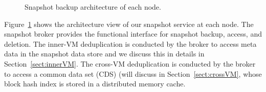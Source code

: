 \begin{figure}[htbp]
  \centering
  \caption{Snapshot backup architecture of each node.}
  \label{fig:arch}
\end{figure}

Figure~\ref{fig:arch} shows the architecture view of our snapshot service
at each node. The snapshot broker provides the functional interface for  snapshot backup, access, and deletion.
The inner-VM  deduplication is conducted by the broker to access meta data in the snapshot data store
and we discuss this in details in Section~\ref{sect:innerVM}.
The cross-VM deduplication is conducted by the broker to access 
a common data set (CDS) (will discuss in Section~\ref{sect:crossVM},
whose block hash index is stored in a distributed memory cache. 

%


